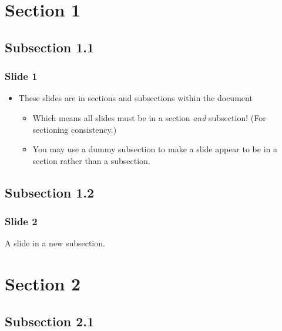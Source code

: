 \documentclass[t]{beamer}
\begin{document}
\section{Section 1%
  \label{section-1}%
}


\subsection{Subsection 1.1%
  \label{subsection-1-1}%
}

\begin{frame}[fragile]
\frametitle{Slide 1}

\begin{itemize}[<+-| alert@+>]

\item These slides are in sections and subsections within the document
\begin{itemize}[<+-| alert@+>]

\item Which means all slides must be in a section
\emph{and} subsection! (For sectioning consistency.)

\item You may use a \textquotedbl{}dummy\textquotedbl{} subsection to make a slide appear to be in a
section rather than a subsection.
\end{itemize}
\end{itemize}

\end{frame}


\subsection{Subsection 1.2%
  \label{subsection-1-2}%
}

\begin{frame}[fragile]
\frametitle{Slide 2}


A slide in a new subsection.

\end{frame}


\section{Section 2%
  \label{section-2}%
}


\subsection{Subsection 2.1%
  \label{subsection-2-1}%
}
\end{document}
